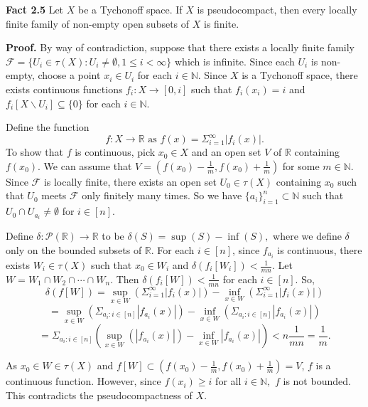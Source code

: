 \documentclass{article}
\begin{document}
\vskip 40pt






\textbf{Fact 2.5} Let $X$ be a Tychonoff space. If $X$ is pseudocompact, then every locally finite family of non-empty open subsets of $X$ is finite.

\vskip 20pt

\textbf{Proof.} By way of contradiction, suppose that there exists a locally finite family $\mathcal{F}=\{U_i \in \tau(X): U_i\neq \emptyset, 1\leq i < \infty\}$ which is infinite. Since each $U_i$ is non-empty, choose a point $x_i\in U_i$ for each $i\in \mathbb{N}$. Since 
$X$ is a Tychonoff space, there exists continuous functions $f_i:X \rightarrow [0,i]$ such that $f_i(x_i)=i$ and 
$f_i[X \backslash U_i] \subseteq \{0\}$ for each $i \in \mathbb{N}$.

\vskip 20pt

 Define the function $$f:X\rightarrow \mathbb{R} \mbox{ as } f(x)=\Sigma_{i=1}^\infty |f_i(x)|.$$ To show that $f$ is continuous, pick $x_0\in X$ and an open set $V$ of $\mathbb{R}$ containing $f(x_0)$. 
We can assume that  $V=(f(x_0)-\frac{1}{m}, f(x_0)+\frac{1}{m})$ for some $m \in \mathbb{N}$.
Since $\mathcal{F}$ is locally finite, there exists an open set $U_0 \in \tau(X)$ containing $x_0$ such that $U_0$ meets $\mathcal{F}$ only finitely many times. 
So we have $\{a_i\}_{i=1}^{n} \subset \mathbb{N}$ such that $U_0\cap U_{a_i} \neq \emptyset$ for $i\in [n].$

\vskip 20pt

Define $\delta: \mathcal{P}(\mathbb{R}) \rightarrow \mathbb{R}$ to be $\delta(S)=\sup (S) - \inf (S),$ where we define $\delta$ only on the bounded subsets of $\mathbb{R}$.
For each $i \in [n]$, since  $f_{a_i}$ is continuous, there exists $W_i \in \tau(X)$ 
such that $x_0\in W_i$ and  $\delta(f_i[W_i])<\frac{1}{mn}$. 
Let $W=W_1 \cap W_2 \cap \cdots \cap W_n$. 
Then $\delta(f_i[W])< \frac{1}{mn}$ for each $i\in [n]$. 
So, $$\delta(f[W])=\sup_{x\in W}\left(\Sigma_{i=1}^\infty |f_i(x)|\right)-\inf_{x\in W}\left(\Sigma_{i=1}^\infty |f_i(x)|\right)$$ 
$$=\sup_{x\in W}\left(\Sigma_{a_i: i\in [n]} |f_{a_i}(x)|\right)-\inf_{x\in W}\left(\Sigma_{a_i: i\in [n]}|f_{a_i}(x)|\right)$$
$$=\Sigma_{a_i: i\in [n]}\left(\sup_{x\in W}( |f_{a_i}(x)|)-\inf_{x\in W}|f_{a_i}(x)|\right)<n\frac{1}{mn}=\frac{1}{m}.$$ 

\vskip 10pt

As $x_0\in W\in \tau(X)$ and $f[W]\subset (f(x_0)-\frac{1}{m}, f(x_0)+\frac{1}{m})=V$, $f$ is a continuous function. 
However, since $f(x_i) \geq i$ for all $i\in \mathbb{N},$ $f$ is  not bounded. This contradicts the pseudocompactness of $X$.
\end{document}
